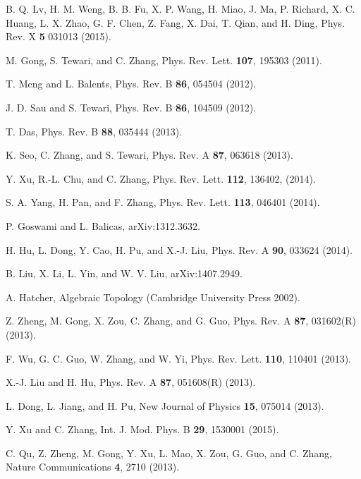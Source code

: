 \documentclass[prl,aps,twocolumn,showpacs,floatfix]{revtex4}
\begin{document}
\begin{thebibliography}{99}
 {B. Q. Lv, H. M. Weng, B. B. Fu, X. P. Wang, H. Miao, J.
Ma, P. Richard, X. C. Huang, L. X. Zhao, G. F. Chen, Z. Fang, X. Dai, T.
Qian, and H. Ding, Phys. Rev. X \textbf{5} 031013 (2015).}

 {M. Gong, S. Tewari, and C. Zhang, Phys. Rev. Lett.
\textbf{107}, 195303 (2011).}

 {T. Meng and L. Balents, Phys. Rev. B \textbf{86},
054504 (2012).}

 {J. D. Sau and S. Tewari, Phys. Rev. B \textbf{86},
104509 (2012).}

 {T. Das, Phys. Rev. B \textbf{88}, 035444 (2013).}

 {K. Seo, C. Zhang, and S. Tewari, Phys. Rev. A
\textbf{87}, 063618 (2013).}

 {Y. Xu, R.-L. Chu, and C. Zhang, Phys. Rev. Lett.
\textbf{112}, 136402, (2014).}

 {S. A. Yang, H. Pan, and F. Zhang, Phys. Rev. Lett.
\textbf{113}, 046401 (2014).}

 {P. Goswami and L. Balicas, arXiv:1312.3632.}

 {H. Hu, L. Dong, Y. Cao, H. Pu, and X.-J. Liu, Phys.
Rev. A \textbf{90}, 033624 (2014).}

 {B. Liu, X. Li, L. Yin, and W. V. Liu,
arXiv:1407.2949.}

 {A. Hatcher, Algebraic Topology (Cambridge University
Press 2002).}

 {Z. Zheng, M. Gong, X. Zou, C. Zhang, and G. Guo,
Phys. Rev. A \textbf{87}, 031602(R) (2013).}

 {F. Wu, G. C. Guo, W. Zhang, and W. Yi, Phys. Rev.
Lett. \textbf{110}, 110401 (2013). }

 {X.-J. Liu and H. Hu, Phys. Rev. A \textbf{87},
051608(R) (2013). }

 {L. Dong, L. Jiang, and H. Pu, New Journal of Physics
\textbf{15}, 075014 (2013).}

 {Y. Xu and C. Zhang, Int. J. Mod. Phys. B \textbf{29},
1530001 (2015).}

 {C. Qu, Z. Zheng, M. Gong, Y. Xu, L. Mao, X. Zou, G. Guo,
and C. Zhang, Nature Communications \textbf{4}, 2710 (2013).}


\end{thebibliography}
\end{document}
